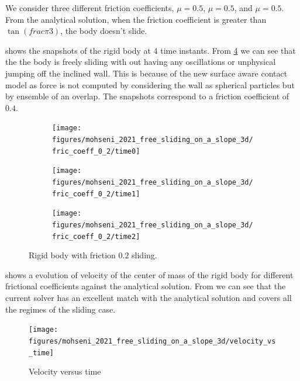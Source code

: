 \documentclass[preprint,12pt]{elsarticle}
\begin{document}
We consider three different friction coefficients, $\mu=0.5$, $\mu=0.5$, and
$\mu=0.5$. From the analytical solution, when the friction coefficient is
greater than $\tan(frac{\pi}{3})$, the body doesn't slide.

 shows the snapshots of the rigid body at 4
time instants. From \cref{fig:mohseni-2021-sliding-3d} we can see that the the
body is freely sliding with out having any oscillations or unphysical jumping
off the inclined wall. This is because of the new surface aware contact model
as force is not computed by considering the wall as spherical particles but by
ensemble of an overlap. The snapshots correspond to a friction coefficient of $0.4$.


\begin{figure}[!htpb]
  \centering
  \begin{subfigure}{0.48\textwidth}
    \centering
    \texttt{[image: figures/mohseni\_2021\_free\_sliding\_on\_a\_slope\_3d/fric\_coeff\_0\_2/time0]}
    \label{fig:passing-0}
  \end{subfigure}
  \begin{subfigure}{0.48\textwidth}
    \centering
    \texttt{[image: figures/mohseni\_2021\_free\_sliding\_on\_a\_slope\_3d/fric\_coeff\_0\_2/time1]}
    \label{fig:passing-1}
  \end{subfigure}

  \begin{subfigure}{0.48\textwidth}
    \centering
    \texttt{[image: figures/mohseni\_2021\_free\_sliding\_on\_a\_slope\_3d/fric\_coeff\_0\_2/time2]}
    \label{fig:passing-2}
  \end{subfigure}
  \caption{Rigid body with friction $0.2$ sliding.}
\label{fig:mohseni-2021-sliding-3d}
\end{figure}

 shows a evolution of
velocity of the center of mass of the rigid body for different frictional
coefficients against the analytical solution. From
 we can see that the current
solver has an excellent match with the analytical solution and covers all the
regimes of the sliding case.


\begin{figure}[!htpb]
  \centering
  \texttt{[image: figures/mohseni\_2021\_free\_sliding\_on\_a\_slope\_3d/velocity\_vs\_time]}
  \caption{Velocity versus time}
\label{fig:results-solid-sliding-velocity-vs-time}
\end{figure}
\end{document}
